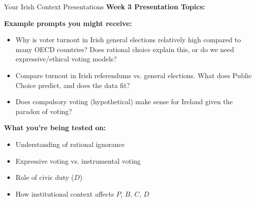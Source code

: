 \documentclass[10pt]{beamer}
\begin{document}
\begin{frame}{Your Irish Context Presentations}
\textbf{Week 3 Presentation Topics:}



\textbf{Example prompts you might receive:}
\begin{itemize}
\item Why is voter turnout in Irish general elections relatively high compared to many OECD countries? Does rational choice explain this, or do we need expressive/ethical voting models?

\item Compare turnout in Irish referendums vs. general elections. What does Public Choice predict, and does the data fit?

\item Does compulsory voting (hypothetical) make sense for Ireland given the paradox of voting?
\end{itemize}



\textbf{What you're being tested on:}
\begin{itemize}
\item Understanding of rational ignorance
\item Expressive voting vs. instrumental voting
\item Role of civic duty ($D$)
\item How institutional context affects $P$, $B$, $C$, $D$
\end{itemize}
\end{frame}
\end{document}
